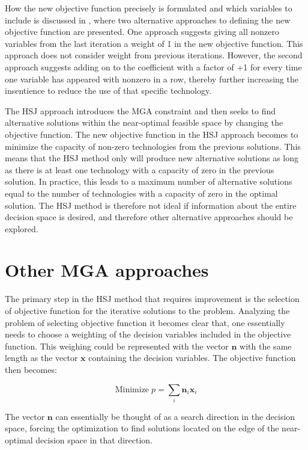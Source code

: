 How the new objective function precisely is formulated and which variables to include is discussed in \cite{DECAROLIS2016}, where two alternative approaches to defining the new objective function are presented. One approach suggests giving all nonzero variables from the last iteration a weight of 1 in the new objective function. This approach does not consider weight from previous iterations. However, the second approach suggests adding on to the coefficient with a factor of +1 for every time one variable has appeared with nonzero in a row, thereby further increasing the insentience to reduce the use of that specific technology. 

The HSJ approach introduces the MGA constraint and then seeks to find alternative solutions within the near-optimal feasible space by changing the objective function. The new objective function in the HSJ approach becomes to minimize the capacity of non-zero technologies from the previous solutions. This means that the HSJ method only will produce new alternative solutions as long as there is at least one technology with a capacity of zero in the previous solution. In practice, this leads to a maximum number of alternative solutions equal to the number of technologies with a capacity of zero in the optimal solution. 
The HSJ method is therefore not ideal if information about the entire decision space is desired, and therefore other alternative approaches should be explored. 

\section{Other MGA approaches}\label{sec:MGA2}

The primary step in the HSJ method that requires improvement is the selection of objective function for the iterative solutions to the problem. Analyzing the problem of selecting objective function it becomes clear that, one essentially needs to choose a weighting of the decision variables included in the objective function. This weighing could be represented with the vector $\mathbf{n}$ with the same length as the vector $\mathbf{x}$ containing the decision variables. The objective function then becomes: 

\begin{equation}\label{eq:objective_func_weighted}
\text{Minimize} \; p = \sum_i \mathbf{n}_i\mathbf{x}_i
\end{equation}

The vector $\mathbf{n}$ can essentially be thought of as a search direction in the decision space, forcing the optimization to find solutions located on the edge of the near-optimal decision space in that direction. 

